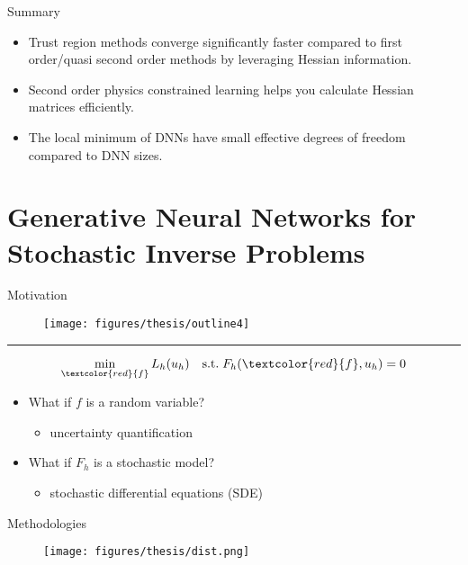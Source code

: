 \documentclass[usenames,dvipsnames]{beamer}
\begin{document}
\begin{frame}{Summary}
	\begin{itemize}
\item Trust region methods converge significantly faster compared to first order/quasi second order methods by leveraging Hessian information. 

\item Second order physics constrained learning helps you calculate Hessian matrices efficiently. 

\item The local minimum of DNNs have small effective degrees of freedom compared to DNN sizes. 
	\end{itemize}
\end{frame}

\section{Generative Neural Networks for Stochastic Inverse Problems}

\begin{frame}{Motivation}
		\begin{figure}[htbp]
		\centering
		\texttt{[image: figures/thesis/outline4]}
	\end{figure}
\begin{center}
	\rule{8cm}{0.4pt}
\end{center}

		\begin{equation*}
		\min_{\textcolor{red}{f}} L_h(u_h) \quad \mathrm{s.t.}\; F_h(\textcolor{red}{f}, u_h) = 0
	\end{equation*}
	\begin{itemize}
\item What if $f$ is a random variable?
\begin{itemize}
	\item uncertainty quantification
\end{itemize}
\item What if $F_h$ is a stochastic model?
\begin{itemize}
	\item stochastic differential equations (SDE)
\end{itemize}
	\end{itemize}
\end{frame}

\begin{frame}{Methodologies}
		\begin{figure}[htbp]
		\centering
		\texttt{[image: figures/thesis/dist.png]}
	\end{figure}
\end{frame}
\end{document}
